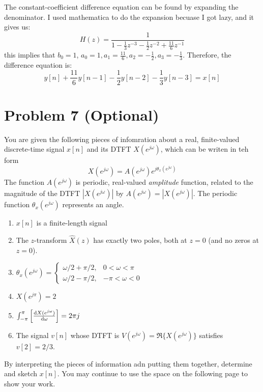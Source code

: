 \documentclass[10pt]{article}
\begin{document}
\begin{enumerate}[label=\alph*)]
			\begin{solution}
				The constant-coefficient difference equation can be found by expanding the denominator. I used 
				mathematica to do the expansion becuase I got lazy, and it gives us:
				\[
				H(z) = \frac{1}{1 - \frac{1}{3}z^{-3} - \frac{1}{2}z^{-2} + \frac{11}{6}z^{-1}}
				\] 
				this implies that \( b_0 = 1 \), \( a_0 = 1, a_1 = \frac{11}{6}, a_2 = -\frac{1}{2}, 
				a_3 = -\frac{1}{3} \). Therefore, the difference equation is:
				\[
					y[n] + \frac{11}{6}y[n - 1] - \frac{1}{2}y[n - 2] - \frac{1}{3}y[n - 3] = x[n]
				\] 
			\end{solution}
	\end{enumerate}

	\pagebreak
	\section*{Problem 7 (Optional)}
	You are given the following pieces of infomration about a real, finite-valued discrete-time signal \( x[n] \) 
	 and its DTFT \( X(e^{j \omega}) \), which can be writen in teh form
	 \[
	 X(e^{j \omega}) = A(e^{j \omega}) e^{j \theta_x (e^{j \omega})}
	 \] 
	 The function \( A(e^{j \omega}) \) is periodic, real-valued \textit{amplitude} function, related to the 
	 magnitude of the DTFT \( |X(e^{j \omega})| \) by \( A(e^{j \omega}) = |X(e^{j \omega})| \). The periodic 
	 function \( \theta_x(e^{j \omega}) \) represents an angle. 
	 \begin{enumerate}[label=\alph*)]
		 \item \( x[n] \) is a finite-length signal
		 \item The \( z \)-transform \( \hat{X}(z) \) has exactly two poles, both at \( z = 0 \) (and no 
			 zeros at \( z = 0 \)). 
		 \item \( \theta_x(e^{j \omega}) = \begin{cases}
				 \omega / 2 + \pi / 2, & 0 < \omega < \pi\\
				 \omega / 2 - \pi / 2, & -\pi < \omega < 0
		 \end{cases} \)
	 \item \( X(e^{j \pi}) = 2 \) 
	 \item \( \int_{-\pi}^{\pi} \left[ \dv{X(e^{j \omega})}{\omega} \right] = 2\pi j \)
	 \item The signal \( v[n] \) whose DTFT is \( V(e^{j \omega}) = \Re \{X (e^{j \omega})\}  \) satisfies 
		 \( v[2] = 2 / 3 \).
	 \end{enumerate}
	 By interpreting the pieces of information adn putting them together, determine and sketch \( x[n] \). You may 
	 continue to use the space on the following page to show your work. 
\end{document}
